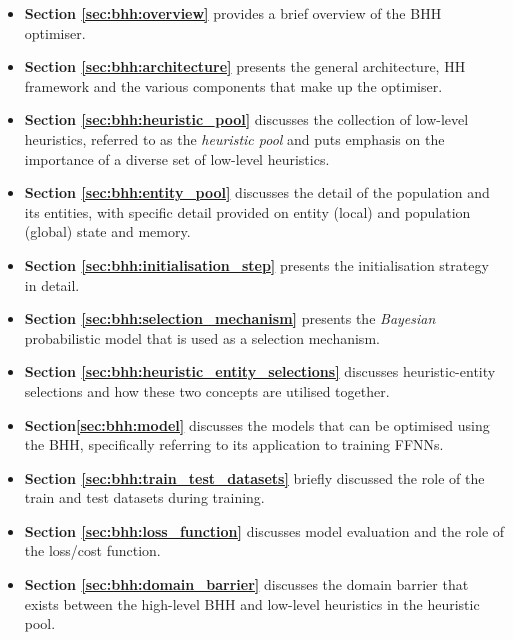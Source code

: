 \begin{itemize}
    \item \textbf{Section \ref{sec:bhh:overview}} provides a brief overview of the \Ac{BHH} optimiser.
    
    \item \textbf{Section \ref{sec:bhh:architecture}} presents the general architecture, \Ac{HH} framework and the various components that make up the optimiser. 
    
     \item \textbf{Section \ref{sec:bhh:heuristic_pool}} discusses the collection of low-level heuristics, referred to as the \textit{heuristic pool} and puts emphasis on the importance of a diverse set of low-level heuristics.
     
    \item \textbf{Section \ref{sec:bhh:entity_pool}} discusses the detail of the population and its entities, with specific detail provided on entity (local) and population (global) state and memory.
    
    \item \textbf{Section \ref{sec:bhh:initialisation_step}} presents the initialisation strategy in detail.
    
    \item \textbf{Section \ref{sec:bhh:selection_mechanism}} presents the \textit{Bayesian} probabilistic model that is used as a selection mechanism.
    
    \item \textbf{Section \ref{sec:bhh:heuristic_entity_selections}} discusses heuristic-entity selections and how these two concepts are utilised together.
    
    \item \textbf{Section\ref{sec:bhh:model}} discusses the models that can be optimised using the \Ac{BHH}, specifically referring to its application to training \acp{FFNN}.
    
    \item \textbf{Section \ref{sec:bhh:train_test_datasets}} briefly discussed the role of the train and test datasets during training.
    
    \item \textbf{Section \ref{sec:bhh:loss_function}} discusses model evaluation and the role of the loss/cost function.
    
    \item \textbf{Section \ref{sec:bhh:domain_barrier}} discusses the domain barrier that exists between the high-level \ac{BHH} and low-level heuristics in the heuristic pool.
    

\end{itemize}
